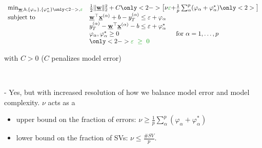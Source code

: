 \begin{frame}\frametitle{\subsecname}

\slidesonly{\vspace{-4mm}}

\begin{block}{}
     \begin{equation}
        \begin{array}{ll}
        \min_{\vec w, b,\{\varphi_\alpha\}, \{\varphi_\alpha^*\}\only<2->{, {\color{darkgreen}{\varepsilon}}}} & \frac{1}{2} \lVert \vec w \rVert_{2}^{2} + C \only<2->{\big\lbrack \nu{\color{darkgreen}\varepsilon} + } \frac{1}{p} \sum_{\alpha}^p (\varphi_\alpha + \varphi_\alpha^*) \only<2>{\big\rbrack}\\
        \text{subject to} & 
        \vec w^{\top} \vec x^{(\alpha)} + b - y_{T}^{(\alpha)} \le \varepsilon + \varphi_\alpha\\
        &
        y_{T}^{(\alpha)} - \vec w^{\top} \vec x^{(\alpha)} - b \le \varepsilon + \varphi_\alpha^*\\
        &\varphi_\alpha, \varphi_\alpha^* \ge 0  \qquad\qquad\qquad\qquad\quad \text{for }\alpha=1,\ldots,p \\
        &\only<2->{{\color{darkgreen}\varepsilon~\ge~0}}
        \end{array}
        \label{eq:primalnu}
     \end{equation}
     
     \slidesonly{\vspace{-3mm}}
        with $C>0$ ($C$ penalizes model error)
\end{block}

\pause


     \slidesonly{\vspace{-3mm}}

     \\
     
\pause

     - Yes, but with increased resolution of how we balance model error and model complexity. %
     $\nu$ acts as a
     \begin{itemize}
     \item upper bound on the fraction of errors: $\nu \ge \frac{1}{p} \sum_{\alpha}^p (\varphi_\alpha + \varphi_\alpha^*)$
     \item lower bound on the fraction of SVs: $\nu \le \frac{\# SV}{p}$.
     \end{itemize}
\end{frame}

